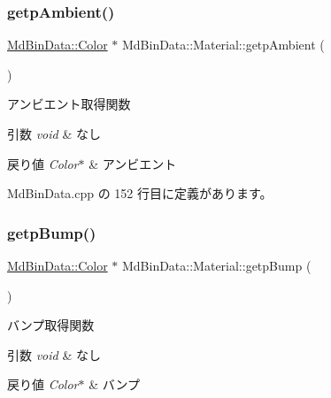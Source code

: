 \subsubsection{\texorpdfstring{getp\+Ambient()}{getpAmbient()}}
{\footnotesize\ttfamily \mbox{\hyperlink{class_md_bin_data_1_1_color}{Md\+Bin\+Data\+::\+Color}} $\ast$ Md\+Bin\+Data\+::\+Material\+::getp\+Ambient (\begin{DoxyParamCaption}{ }\end{DoxyParamCaption})}



アンビエント取得関数 


\begin{DoxyParams}{引数}
{\em void} & なし \\
\hline
\end{DoxyParams}

\begin{DoxyRetVals}{戻り値}
{\em Color$\ast$} & アンビエント \\
\hline
\end{DoxyRetVals}


 Md\+Bin\+Data.\+cpp の 152 行目に定義があります。

\mbox{\label{class_md_bin_data_1_1_material_aec6d9f8f6c8e733c9165d39eebd55cc1}} 
\subsubsection{\texorpdfstring{getp\+Bump()}{getpBump()}}
{\footnotesize\ttfamily \mbox{\hyperlink{class_md_bin_data_1_1_color}{Md\+Bin\+Data\+::\+Color}} $\ast$ Md\+Bin\+Data\+::\+Material\+::getp\+Bump (\begin{DoxyParamCaption}{ }\end{DoxyParamCaption})}



バンプ取得関数 


\begin{DoxyParams}{引数}
{\em void} & なし \\
\hline
\end{DoxyParams}

\begin{DoxyRetVals}{戻り値}
{\em Color$\ast$} & バンプ \\
\hline
\end{DoxyRetVals}


